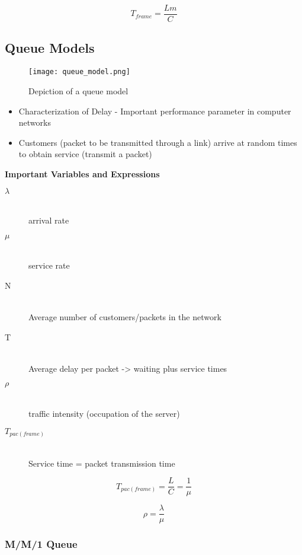\documentclass[../resumosRCOM.tex]{subfiles}
\begin{document}
\begin{equation}
    T_{frame} = \frac{Lm}{C}
\end{equation}

\subsection{Queue Models}

\begin{figure}[H]
    \centering
    \texttt{[image: queue\_model.png]}
    \caption{Depiction of a queue model}
\end{figure}

\begin{itemize}
    \item Characterization of Delay - Important performance parameter in computer networks
    \item Customers (packet to be transmitted through a link) arrive at random times to obtain service (transmit a packet) 
\end{itemize}

\textbf{Important Variables and Expressions}
\begin{description}
    \item[\(\lambda\)] \hfill \\ arrival rate
    \item[\(\mu\)] \hfill \\ service rate
    \item[N] \hfill \\ Average number of customers/packets in the network
    \item[T] \hfill \\ Average delay per packet -> waiting plus service times 
    \item[\(\rho\)] \hfill \\ traffic intensity (occupation of the server)
    \item[\(T_{pac(frame)}\)] \hfill \\ Service time = packet transmission time
\end{description}

\begin{equation}
    T_{pac(frame)} = \frac{L}{C} = \frac{1}{\mu}
\end{equation}

\begin{equation}
    \rho = \frac{\lambda}{\mu}
\end{equation}

\subsubsection{M/M/1 Queue}
\end{document}
